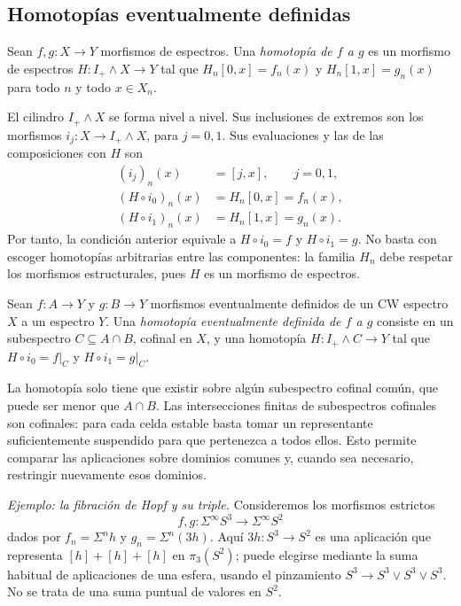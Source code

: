 \subsection{Homotopías eventualmente definidas}

\begin{defi}\label{defi:c11-homotopia-espectros}
Sean $f,g\colon X\to Y$ morfismos de espectros. Una \emph{homotopía de $f$ a $g$} es un morfismo de espectros $H\colon I_+\wedge X\to Y$ tal que $H_n[0,x]=f_n(x)$ y $H_n[1,x]=g_n(x)$ para todo $n$ y todo $x\in X_n$.
\end{defi}

El cilindro $I_+\wedge X$ se forma nivel a nivel. Sus inclusiones de extremos son los morfismos $i_j\colon X\to I_+\wedge X$, para $j=0,1$. Sus evaluaciones y las de las composiciones con $H$ son
\[
\begin{aligned}
(i_j)_n(x)&=[j,x],\qquad j=0,1,\\
(H\circ i_0)_n(x)&=H_n[0,x]=f_n(x),\\
(H\circ i_1)_n(x)&=H_n[1,x]=g_n(x).
\end{aligned}
\]
Por tanto, la condición anterior equivale a $H\circ i_0=f$ y $H\circ i_1=g$. No basta con escoger homotopías arbitrarias entre las componentes: la familia $H_n$ debe respetar los morfismos estructurales, pues $H$ es un morfismo de espectros.

\begin{defi}\label{defi:c11-homotopia-eventual}
Sean $f\colon A\to Y$ y $g\colon B\to Y$ morfismos eventualmente definidos de un CW espectro $X$ a un espectro $Y$. Una \emph{homotopía eventualmente definida de $f$ a $g$} consiste en un subespectro $C\subseteq A\cap B$, cofinal en $X$, y una homotopía $H\colon I_+\wedge C\to Y$ tal que $H\circ i_0=f|_C$ y $H\circ i_1=g|_C$.
\end{defi}

La homotopía solo tiene que existir sobre algún subespectro cofinal común, que puede ser menor que $A\cap B$. Las intersecciones finitas de subespectros cofinales son cofinales: para cada celda estable basta tomar un representante suficientemente suspendido para que pertenezca a todos ellos. Esto permite comparar las aplicaciones sobre dominios comunes y, cuando sea necesario, restringir nuevamente esos dominios.

\emph{Ejemplo: la fibración de Hopf y su triple.} Consideremos los morfismos estrictos
\[
f,g\colon\Sigma^\infty S^3\to\Sigma^\infty S^2
\]
 dados por $f_n=\Sigma^nh$ y $g_n=\Sigma^n(3h)$. Aquí $3h\colon S^3\to S^2$ es una aplicación que representa $[h]+[h]+[h]$ en $\pi_3(S^2)$; puede elegirse mediante la suma habitual de aplicaciones de una esfera, usando el pinzamiento $S^3\to S^3\vee S^3\vee S^3$. No se trata de una suma puntual de valores en $S^2$.

